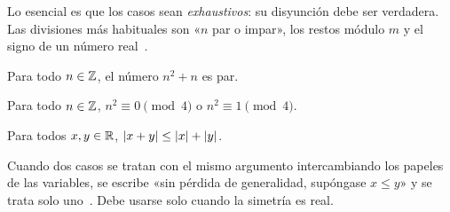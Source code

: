 Lo esencial es que los casos sean \emph{exhaustivos}: su disyunción debe ser verdadera. Las divisiones más habituales son «$n$ par o impar», los restos módulo $m$ y el signo de un número real~\cite[§4.4]{hammack}.

\begin{proposicion}\label{prop:consecutivos}
Para todo $n\in\mathbb{Z}$, el número $n^{2}+n$ es par.
\end{proposicion}

\begin{proposicion}\label{prop:cuadrado-mod4}
Para todo $n\in\mathbb{Z}$, $n^{2}\equiv 0\pmod 4$ o $n^{2}\equiv 1\pmod 4$.
\end{proposicion}

\begin{teorema}\label{teo:triangular}
Para todos $x,y\in\mathbb{R}$, $\lvert x+y\rvert\le\lvert x\rvert+\lvert y\rvert$.
\end{teorema}

Cuando dos casos se tratan con el mismo argumento intercambiando los papeles de las variables, se escribe «sin pérdida de generalidad, supóngase $x\le y$» y se trata solo uno~\cite[§4.5]{hammack}. Debe usarse solo cuando la simetría es real.

\addtocounter{definicion}{1}%

\addtocounter{definicion}{1}%

